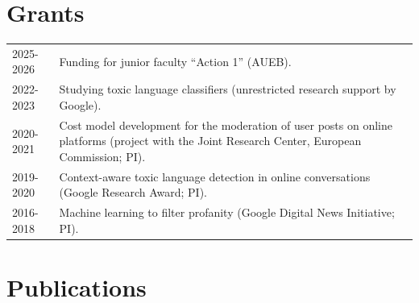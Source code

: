 \documentclass[a4paper,12pt]{article}
\begin{document}

\section{Grants}
\begin{tabularx}{\linewidth}{@{}l X@{}}	
2025-2026 & Funding for junior faculty ``Action 1'' (AUEB).\\
2022-2023 & Studying toxic language classifiers (unrestricted research support by Google).
\\
2020-2021 & Cost model development for the moderation of user posts on online platforms (project with the Joint Research Center, European Commission; PI).
\\
2019-2020 & Context-aware toxic language detection in online conversations (Google Research Award; PI).
\\
2016-2018 & Machine learning to filter profanity (Google Digital News Initiative; PI).
\end{tabularx}

\section{Publications}
\begin{refsection}
\nocite{*}
\printbibliography[heading=none]
\end{refsection}


\vfill
{}
\end{document}
